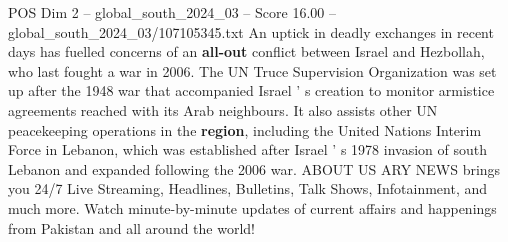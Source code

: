 \begin{textsample}{POS Dim 2 – global\_south\_2024\_03 – Score 16.00 – global\_south\_2024\_03/107105345.txt}
An uptick in deadly exchanges in recent days has fuelled concerns of an \textbf{all-out} conflict between Israel and Hezbollah, who last fought a war in 2006.
The UN Truce Supervision Organization was set up after the 1948 war that accompanied Israel ' s creation to monitor armistice agreements reached with its Arab neighbours.
It also assists other UN peacekeeping operations in the \textbf{region}, including the United Nations Interim Force in Lebanon, which was established after Israel ' s 1978 invasion of south Lebanon and expanded following the 2006 war.
ABOUT US ARY NEWS brings you 24/7 Live Streaming, Headlines, Bulletins, Talk Shows, Infotainment, and much more.
Watch minute-by-minute updates of current affairs and happenings from Pakistan and all around the world!

\end{textsample}
